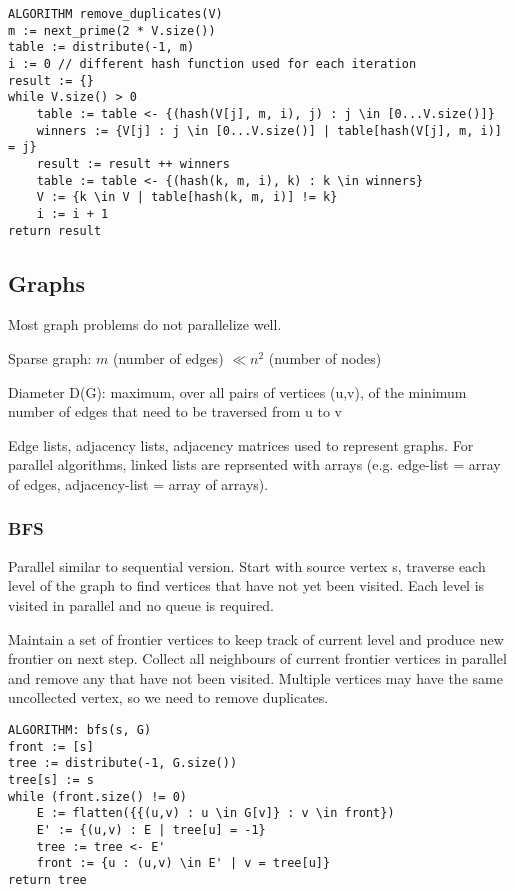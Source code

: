 \begin{lstlisting}
ALGORITHM remove_duplicates(V)
m := next_prime(2 * V.size())
table := distribute(-1, m)
i := 0 // different hash function used for each iteration
result := {}
while V.size() > 0
    table := table <- {(hash(V[j], m, i), j) : j \in [0...V.size()]}
    winners := {V[j] : j \in [0...V.size()] | table[hash(V[j], m, i)] = j}
    result := result ++ winners
    table := table <- {(hash(k, m, i), k) : k \in winners}
    V := {k \in V | table[hash(k, m, i)] != k}
    i := i + 1
return result
\end{lstlisting}

\subsection{Graphs}

Most graph problems do not parallelize well.

\begin{definition}
Sparse graph: $m$ (number of edges) $\ll n^2$ (number of nodes)
\end{definition}
\begin{definition}
Diameter D(G): maximum, over all pairs of vertices (u,v), of the minimum number of edges that need to be traversed from u to v
\end{definition}

Edge lists, adjacency lists, adjacency matrices used to represent graphs. For parallel algorithms, linked lists are reprsented with arrays (e.g. edge-list = array of edges, adjacency-list = array of arrays).

\subsubsection{BFS}

Parallel similar to sequential version. Start with source vertex s, traverse each level of the graph to find vertices that have not yet been visited. Each level is visited in parallel and no queue is required. 

Maintain a set of frontier vertices to keep track of current level and produce new frontier on next step. Collect all neighbours of current frontier vertices in parallel and remove any that have not been visited. Multiple vertices may have the same uncollected vertex, so we need to remove duplicates. 

\begin{lstlisting}
ALGORITHM: bfs(s, G)
front := [s]
tree := distribute(-1, G.size())
tree[s] := s
while (front.size() != 0)
    E := flatten({{(u,v) : u \in G[v]} : v \in front})
    E' := {(u,v) : E | tree[u] = -1}
    tree := tree <- E'
    front := {u : (u,v) \in E' | v = tree[u]}
return tree
\end{lstlisting}

